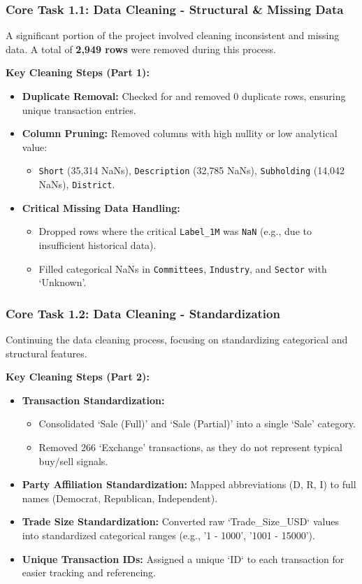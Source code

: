 \documentclass[aspectratio=169]{beamer}
\begin{document}
\begin{frame}
    \frametitle{Core Task 1.1: Data Cleaning - Structural & Missing Data}
    A significant portion of the project involved cleaning inconsistent and missing data. A total of \textbf{2,949 rows} were removed during this process.

    \textbf{Key Cleaning Steps (Part 1):}
    \begin{itemize}
        \item \textbf{Duplicate Removal:} Checked for and removed 0 duplicate rows, ensuring unique transaction entries.
        \item \textbf{Column Pruning:} Removed columns with high nullity or low analytical value:
        \begin{itemize}
            \item \texttt{Short} (35,314 NaNs), \texttt{Description} (32,785 NaNs), \texttt{Subholding} (14,042 NaNs), \texttt{District}.
        \end{itemize}
        \item \textbf{Critical Missing Data Handling:}
        \begin{itemize}
            \item Dropped rows where the critical \texttt{Label_1M} was \texttt{NaN} (e.g., due to insufficient historical data).
            \item Filled categorical NaNs in \texttt{Committees}, \texttt{Industry}, and \texttt{Sector} with `Unknown'.
        \end{itemize}
    \end{itemize}
\end{frame}

\begin{frame}
    \frametitle{Core Task 1.2: Data Cleaning - Standardization}
    Continuing the data cleaning process, focusing on standardizing categorical and structural features.

    \textbf{Key Cleaning Steps (Part 2):}
    \begin{itemize}
        \item \textbf{Transaction Standardization:}
        \begin{itemize}
            \item Consolidated `Sale (Full)' and `Sale (Partial)' into a single `Sale' category.
            \item Removed 266 `Exchange' transactions, as they do not represent typical buy/sell signals.
        \end{itemize}
        \item \textbf{Party Affiliation Standardization:} Mapped abbreviations (D, R, I) to full names (Democrat, Republican, Independent).
        \item \textbf{Trade Size Standardization:} Converted raw `Trade_Size_USD` values into standardized categorical ranges (e.g., '1 - 1000', '1001 - 15000').
        \item \textbf{Unique Transaction IDs:} Assigned a unique `ID` to each transaction for easier tracking and referencing.
    \end{itemize}
\end{frame}
\end{document}

